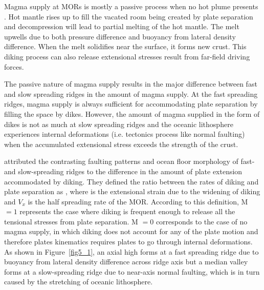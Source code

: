 \documentclass[12pt]{article}
\begin{document}
%

Magma supply at MORs is mostly a passive process when no hot plume presents \citep{Fowler2004}. Hot mantle rises up to fill the vacated room being created by plate separation and decompression will lead to partial melting of the hot mantle. The melt upwells due to both pressure difference and buoyancy from lateral density difference. When the melt solidifies near the surface, it forms new crust. This diking process can also release extensional stresses result from far-field driving forces.

The passive nature of magma supply results in the major difference between fast and slow spreading ridges in the amount of magma supply. At the fast spreading ridges, magma supply is always sufficient for accommodating plate separation by filling the space by dikes. However, the amount of magma supplied in the form of dikes is not as much at slow spreading ridges and the oceanic lithosphere experiences internal deformations (i.e. tectonics process like normal faulting) when the accumulated extensional stress exceeds the strength of the crust. 

\citet{Buck2005} attributed the contrasting faulting patterns and ocean floor morphology of fast- and slow-spreading ridges to the difference in the amount of plate extension accommodated by diking. They defined the ratio between the rates of diking and plate separation as , where  is the extensional strain  due to the widening of diking and $V_{x}$ is the half spreading rate of the MOR. According to this definition, M $=1$ represents the case where diking is frequent enough to release all the tensional stresses from plate separation. M $=0$ corresponds to the case of no magma supply, in which diking does not account for any of the plate motion and therefore plates kinematics requires plates to go through internal deformations. As shown in Figure~\ref{fig5_1}, an axial high forms at a fast spreading ridge  due to buoyancy from lateral density difference across ridge axis but a median valley forms at a slow-spreading ridge  due to near-axis normal faulting, which is in turn caused by the stretching of oceanic lithosphere.
\end{document}

